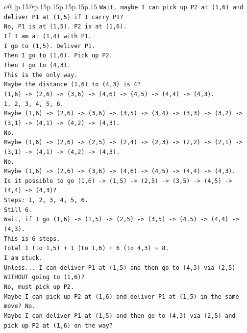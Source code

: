 \documentclass{article}
\begin{document}
{\begin{supertabular}{c@{$\;$}|p{.15\linewidth}@{}p{.15\linewidth}p{.15\linewidth}p{.15\linewidth}p{.15\linewidth}p{.15\linewidth}}
{{{\texttt{Wait, maybe I can pick up P2 at (1,6) and deliver P1 at (1,5) if I carry P1?} \\
\texttt{No, P1 is at (1,5). P2 is at (1,6).} \\
\texttt{If I am at (1,4) with P1.} \\
\texttt{I go to (1,5). Deliver P1.} \\
\texttt{Then I go to (1,6). Pick up P2.} \\
\texttt{Then I go to (4,3).} \\
\texttt{This is the only way.} \\
\texttt{Maybe the distance (1,6) to (4,3) is 4?} \\
\texttt{(1,6) {-}> (2,6) {-}> (3,6) {-}> (4,6) {-}> (4,5) {-}> (4,4) {-}> (4,3).} \\
\texttt{1, 2, 3, 4, 5, 6.} \\
\texttt{Maybe (1,6) {-}> (2,6) {-}> (3,6) {-}> (3,5) {-}> (3,4) {-}> (3,3) {-}> (3,2) {-}> (3,1) {-}> (4,1) {-}> (4,2) {-}> (4,3).} \\
\texttt{No.} \\
\texttt{Maybe (1,6) {-}> (2,6) {-}> (2,5) {-}> (2,4) {-}> (2,3) {-}> (2,2) {-}> (2,1) {-}> (3,1) {-}> (4,1) {-}> (4,2) {-}> (4,3).} \\
\texttt{No.} \\
\texttt{Maybe (1,6) {-}> (2,6) {-}> (3,6) {-}> (4,6) {-}> (4,5) {-}> (4,4) {-}> (4,3).} \\
\texttt{Is it possible to go (1,6) {-}> (1,5) {-}> (2,5) {-}> (3,5) {-}> (4,5) {-}> (4,4) {-}> (4,3)?} \\
\texttt{Steps: 1, 2, 3, 4, 5, 6.} \\
\texttt{Still 6.} \\
\texttt{Wait, if I go (1,6) {-}> (1,5) {-}> (2,5) {-}> (3,5) {-}> (4,5) {-}> (4,4) {-}> (4,3).} \\
\texttt{This is 6 steps.} \\
\texttt{Total 1 (to 1,5) + 1 (to 1,6) + 6 (to 4,3) = 8.} \\
\texttt{I am stuck.} \\
\texttt{Unless... I can deliver P1 at (1,5) and then go to (4,3) via (2,5) WITHOUT going to (1,6)?} \\
\texttt{No, must pick up P2.} \\
\texttt{Maybe I can pick up P2 at (1,6) and deliver P1 at (1,5) in the same move? No.} \\
\texttt{Maybe I can deliver P1 at (1,5) and then go to (4,3) via (2,5) and pick up P2 at (1,6) on the way?} \\
}}}
\end{supertabular}}
\end{document}

